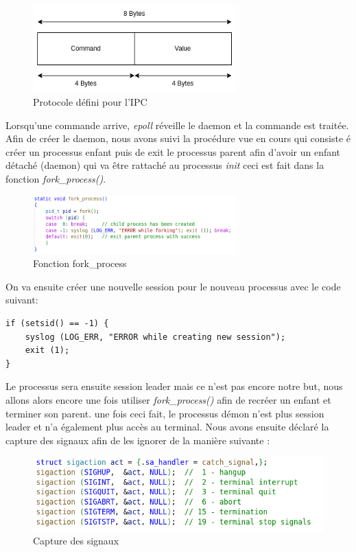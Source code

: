 \documentclass{ReportTemplate}
\begin{document}
\begin{figure}[H]
    \centering
    \includegraphics[width= 0.7\textwidth]{imageSources/Protocol.png}
    \caption{Protocole défini pour l'IPC}
    \label{fig:Protocol}
\end{figure}
Lorsqu'une commande arrive, \textit{epoll} réveille le daemon et la commande est
traitée.\newpage
Afin de créer le daemon, nous avons suivi la procédure vue en cours qui consiste
é créer un processus enfant puis de exit le processus parent afin d'avoir un
enfant détaché (daemon) qui va être rattaché au processus \textit{init} ceci est fait dans la fonction \textit{fork\_process()}.
\begin{figure}[H]
    \centering
    \includegraphics[width= 0.7\textwidth]{imageSources/fork_process.png}
    \caption{Fonction fork\_process}
    \label{fig:ForkProcess}
\end{figure}
On va ensuite créer une nouvelle session pour le nouveau processus avec le code
suivant:
\begin{verbatim}
if (setsid() == -1) {
    syslog (LOG_ERR, "ERROR while creating new session"); 
    exit (1);
}
\end{verbatim}
Le processus sera ensuite session leader mais ce n'est pas encore notre but,
nous allons alors encore une fois utiliser \textit{fork\_process()} afin de
recréer un enfant et terminer son parent. une fois ceci fait, le processus démon
n'est plus session leader et n'a également plus accès au terminal.\newline
Nous avons ensuite déclaré la capture des signaux afin de les ignorer de la
manière suivante :
\begin{figure}[H]
    \centering
    \includegraphics[width= \textwidth]{imageSources/signals_capture.png}
    \caption{Capture des signaux}
    \label{fig:SignalsCapture}
\end{figure}
\end{document}
